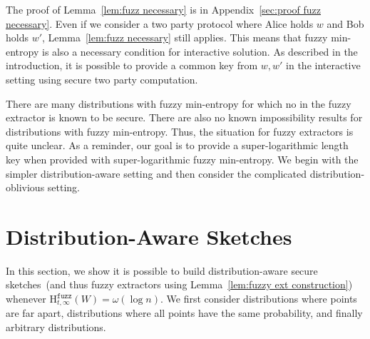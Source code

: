 \documentclass[11pt]{article}
\newcommand{\secref}[1]{\mbox{Section~\ref{#1}}}
\newcommand{\apref}[1]{\mbox{Appendix~\ref{#1}}}
\newcommand{\lemref}[1]{\mbox{Lemma~\ref{#1}}}
\newcommand{\Hfuzz}{\mathrm{H}^{\mathtt{fuzz}}_{t,\infty}}
\newcommand{\authnote}[2]{{\textcolor{red}{\textsf{#1 notes: }\textcolor{blue}{ #2}}\marginpar{\textcolor{red}{\textbf{!!!!!}}}}}
\newcommand{\authnote}[2]{}
\newcommand{\bnote}[1]{{\authnote{Ben}{#1}}}
\begin{document}
The proof of \lemref{lem:fuzz necessary} is in \apref{sec:proof fuzz necessary}.
Even if we consider a two party protocol where Alice holds $w$ and Bob holds $w'$, 
\lemref{lem:fuzz necessary} still applies.  
This means that fuzzy min-entropy is also a necessary condition for interactive solution.  As described in the introduction, it is possible to provide a common key from $w, w'$ in the interactive setting using secure two party computation.

There are many distributions with fuzzy min-entropy for which no in the fuzzy extractor is known to be secure.  There are also no known impossibility results for distributions with fuzzy min-entropy.  Thus, the situation for fuzzy extractors is quite unclear.
As a reminder, our goal is to provide a super-logarithmic length key when provided with super-logarithmic fuzzy min-entropy.  We begin with the simpler distribution-aware setting and then consider the complicated distribution-oblivious setting.






\section{Distribution-Aware  Sketches}
\label{sec:distribution aware}
In this section, we show it is possible to build distribution-aware secure sketches~(and thus fuzzy extractors using \lemref{lem:fuzzy ext construction}) whenever $\Hfuzz(W)= \omega(\log n)$.
We first consider distributions where points are far apart, distributions where all points have the same probability, and finally arbitrary distributions.



\end{document}

